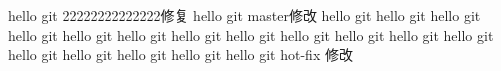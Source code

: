 hello git 22222222222222修复
hello git master修改
hello git
hello git
hello git
hello git
hello git
hello git
hello git
hello git
hello git
hello git
hello git
hello git
hello git
hello git
hello git
hello git
hello git hot-fix 修改


